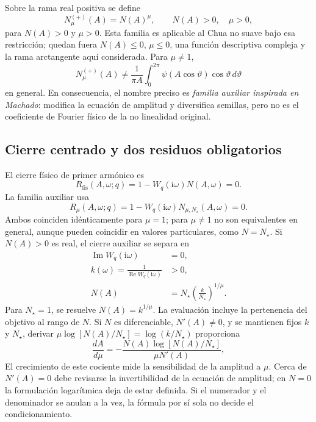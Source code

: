 Sobre la rama real positiva se define
\begin{equation}
 N_\mu^{(+)}(A)=N(A)^\mu,
 \qquad N(A)>0,\quad \mu>0,
 \label{eq:hafo-machado}
\end{equation}
para \(N(A)>0\) y \(\mu>0\). Esta familia es aplicable al Chua no suave bajo
esa restricción; quedan fuera \(N(A)\leq0\), \(\mu\leq0\), una función
descriptiva compleja y la rama arctangente aquí considerada. Para
\(\mu\neq1\),
\begin{equation}
 N_\mu^{(+)}(A)
 \neq\frac{1}{\pi A}\int_0^{2\pi}
 \psi(A\cos\vartheta)\cos\vartheta\,d\vartheta
 \label{eq:machado-not-physical-fourier}
\end{equation}
en general. En consecuencia, el nombre preciso es
\emph{familia auxiliar inspirada en Machado}: modifica la ecuación de
amplitud y diversifica semillas, pero no es el coeficiente de Fourier físico
de la no linealidad original.

\subsection{Cierre centrado y dos residuos obligatorios}

El cierre físico de primer armónico es
\begin{equation}
 R_{\mathrm{fis}}(A,\omega;q)
 =1-W_q(\mathrm i\omega)N(A,\omega)=0.
 \label{eq:machado-physical-closure}
\end{equation}
La familia auxiliar usa
\begin{equation}
 R_{\mu}(A,\omega;q)
 =1-W_q(\mathrm i\omega)N_{\mu,N_\star}(A,\omega)=0.
 \label{eq:machado-aux-closure}
\end{equation}
Ambos coinciden idénticamente para \(\mu=1\); para \(\mu\ne1\) no
son equivalentes en general, aunque pueden coincidir en valores particulares,
como \(N=N_\star\). Si \(N(A)>0\) es
real, el cierre auxiliar se separa en
\begin{align}
 \operatorname{Im}W_q(\mathrm i\omega)&=0,
 \label{eq:machado-frequency}\\
 k(\omega)=\frac{1}{\operatorname{Re}W_q(\mathrm i\omega)}&>0,
 \label{eq:machado-gain}\\
 N(A)&=N_\star\left(\frac{k}{N_\star}\right)^{1/\mu}.
 \label{eq:machado-amplitude}
\end{align}
Para \(N_\star=1\), se resuelve \(N(A)=k^{1/\mu}\). La evaluación incluye la
pertenencia del objetivo al rango de \(N\). Si \(N\) es diferenciable,
\(N'(A)\ne0\), y se mantienen fijos \(k\) y \(N_\star\), derivar
\(\mu\log[N(A)/N_\star]=\log(k/N_\star)\) proporciona
\begin{equation}
 \frac{dA}{d\mu}
 =-\frac{N(A)\log[N(A)/N_\star]}{\mu N'(A)},
 \label{eq:machado-sensitivity}
\end{equation}
El crecimiento de este cociente mide la sensibilidad de la amplitud a
\(\mu\). Cerca de \(N'(A)=0\) debe revisarse la invertibilidad de la
ecuación de amplitud; en \(N=0\) la formulación logarítmica deja de
estar definida. Si el numerador y el denominador se anulan a la vez,
la fórmula por sí sola no decide el condicionamiento.

